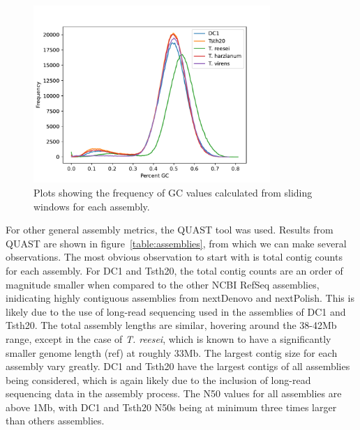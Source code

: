 \begin{figure}
  \begin{center}
    \includegraphics[width=0.8\textwidth]{figures/gc-plot.pdf}
  \end{center}
  \caption{Plots showing the frequency of GC values calculated from
    sliding windows for each assembly.}
  \label{fig:assembly-gc}
\end{figure}

For other general assembly metrics, the QUAST tool was used. Results
from QUAST are shown in figure~\ref{table:assemblies}, from which we can
make several observations. The most obvious observation to start with
is total contig counts for each assembly. For DC1 and Tsth20, the
total contig counts are an order of magnitude smaller when compared to
the other NCBI RefSeq assemblies, inidicating highly contiguous
assemblies from nextDenovo and nextPolish. This is likely due to the
use of long-read sequencing used in the assemblies of DC1 and
Tsth20. The total assembly lengths are similar, hovering around the
38-42Mb range, except in the case of \textit{T. reesei}, which is
known to have a significantly smaller genome length (ref) at roughly
33Mb. The largest contig size for each assembly vary greatly. DC1 and
Tsth20 have the largest contigs of all assemblies being considered,
which is again likely due to the inclusion of long-read sequencing
data in the assembly process. The N50 values for all assemblies are
above 1Mb, with DC1 and Tsth20 N50s being at minimum three times
larger than others assemblies.


